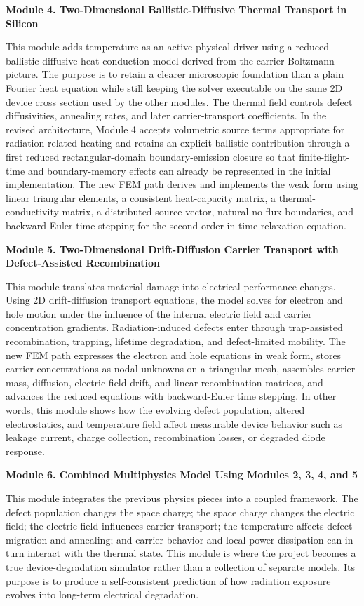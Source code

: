 \documentclass[11pt]{article}
\begin{document}
\textbf{Module 4. Two-Dimensional Ballistic-Diffusive Thermal Transport in Silicon}

This module adds temperature as an active physical driver using a reduced ballistic-diffusive heat-conduction model derived from the carrier Boltzmann picture. The purpose is to retain a clearer microscopic foundation than a plain Fourier heat equation while still keeping the solver executable on the same 2D device cross section used by the other modules. The thermal field controls defect diffusivities, annealing rates, and later carrier-transport coefficients. In the revised architecture, Module 4 accepts volumetric source terms appropriate for radiation-related heating and retains an explicit ballistic contribution through a first reduced rectangular-domain boundary-emission closure so that finite-flight-time and boundary-memory effects can already be represented in the initial implementation. The new FEM path derives and implements the weak form using linear triangular elements, a consistent heat-capacity matrix, a thermal-conductivity matrix, a distributed source vector, natural no-flux boundaries, and backward-Euler time stepping for the second-order-in-time relaxation equation.

\textbf{Module 5. Two-Dimensional Drift-Diffusion Carrier Transport with Defect-Assisted Recombination}

This module translates material damage into electrical performance changes. Using 2D drift-diffusion transport equations, the model solves for electron and hole motion under the influence of the internal electric field and carrier concentration gradients. Radiation-induced defects enter through trap-assisted recombination, trapping, lifetime degradation, and defect-limited mobility. The new FEM path expresses the electron and hole equations in weak form, stores carrier concentrations as nodal unknowns on a triangular mesh, assembles carrier mass, diffusion, electric-field drift, and linear recombination matrices, and advances the reduced equations with backward-Euler time stepping. In other words, this module shows how the evolving defect population, altered electrostatics, and temperature field affect measurable device behavior such as leakage current, charge collection, recombination losses, or degraded diode response.

\textbf{Module 6. Combined Multiphysics Model Using Modules 2, 3, 4, and 5}

This module integrates the previous physics pieces into a coupled framework. The defect population changes the space charge; the space charge changes the electric field; the electric field influences carrier transport; the temperature affects defect migration and annealing; and carrier behavior and local power dissipation can in turn interact with the thermal state. This module is where the project becomes a true device-degradation simulator rather than a collection of separate models. Its purpose is to produce a self-consistent prediction of how radiation exposure evolves into long-term electrical degradation.
\end{document}
